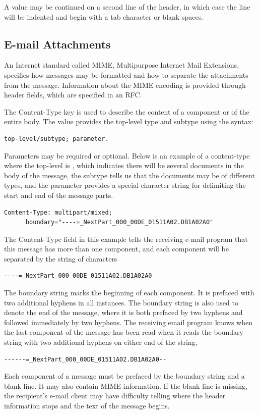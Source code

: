 A value may be continued on a second line of the header, in which
case the line will be indented and begin with a tab character or
blank spaces.

\subsection{E-mail Attachments}

An Internet standard called MIME, 
Multipurpose Internet Mail Extensions, 
specifies how messages may be formatted and how to separate 
the attachments from the message. 
Information about the MIME encoding is provided through header fields, 
which are specified in an RFC. 

The Content-Type key is used to describe the content of a component
or of the entire body. 
The value provides the top-level type and subtype using the 
syntax:  
\begin{verbatim}
top-level/subtype; parameter.
\end{verbatim}
Parameters may be required or optional.
Below is an example of a content-type where the 
top-level is , which indicates there will be several 
documents in the body of the message, the  subtype tells
us that the documents may be of different types, and the 
parameter provides a special character string for delimiting the
start and end of the message parts.
\begin{verbatim}
Content-Type: multipart/mixed;
      boundary="----=_NextPart_000_00DE_01511A02.DB1A02A0"
\end{verbatim}
The Content-Type field in this example tells the receiving 
e-mail program that this message has more than one component, and each 
component will be separated by the string of characters 
\begin{verbatim}----=_NextPart_000_00DE_01511A02.DB1A02A0\end{verbatim}
The boundary string marks the beginning of each component.
It is prefaced with two additional hyphens in all instances.
The boundary string is also used to denote the end of the message, 
where it is both prefaced by two hyphens and followed immediately by two 
hyphens. 
The receiving email program knows when the last component of the message
has been read when it reads the boundary string with two additional
hyphens on either end of the string,
\begin{verbatim}------=_NextPart_000_00DE_01511A02.DB1A02A0--\end{verbatim}
Each component of a message must be prefaced by the boundary string
and a blank line. 
It may also contain MIME information.
If the blank line is missing, the recipient's e-mail client may have 
difficulty telling where the header information stops and the text of the 
message begins.

